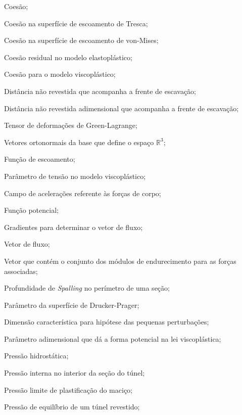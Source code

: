 

\item[\textbf{Latino minúsculo:}]
\item[$c$]				Coesão;
\item[$c_{TR}$]			Coesão na superfície de escoamento de Tresca;
\item[$c_{VM}$]			Coesão na superfície de escoamento de von-Mises;
\item[$c_0$]			Coesão residual no modelo elastoplástico;
\item[$c_1$]			Coesão para o modelo viscoplástico;
\item[$d_0$]			Distância não revestida que acompanha a frente de escavação;
\item[$d_0^*$]			Distância não revestida adimensional que acompanha a frente de escavação;
\item[$ \greenll $] 	Tensor de deformações de Green-Lagrange;
\item[$\euml, \edoisl, \etresl$] Vetores ortonormais da base que define o espaço $\mathbb{R}^3$;
\item[$f$]				Função de escoamento;
\item[$f_0$]			Parâmetro de tensão no modelo viscoplástico;
\item[$\fl$]					Campo de acelerações referente às forças de corpo;
\item[$g$]				Função potencial;
\item[$\gllum, \glldois, \glltres$] Gradientes para determinar o vetor de fluxo;
\item[$\dgdsll$]		Vetor de fluxo;
\item[$\hl$]			Vetor que contém o conjunto dos módulos de endurecimento para as forças associadas;
\item[$h_s$]			Profundidade de \textit{Spalling} no perímetro de uma seção;
\item[$k$] 				Parâmetro da superfície de Drucker-Prager;
\item[$l_0$] 			Dimensão característica para hipótese das pequenas perturbações;
\item[$n$] 				Parâmetro adimensional que dá a forma potencial na lei viscoplástica;
\item[$ p $]			Pressão hidrostática;
\item[$ p_i $]			Pressão interna no interior da seção do túnel;
\item[$ p_{lim} $] 		Pressão limite de plastificação do maciço;
\item[$ p_{eq} $] 		Pressão de equilíbrio de um túnel revestido;
